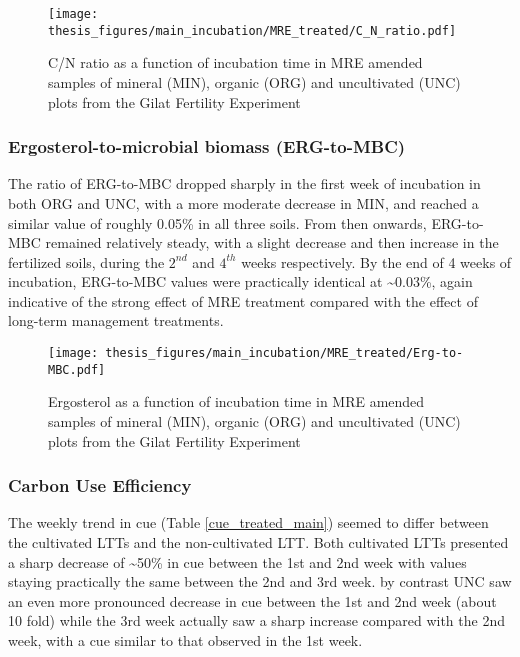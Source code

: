 \documentclass[12pt]{report}
\begin{document}
		\begin{figure}[H]
			\centering
			\texttt{[image: thesis\_figures/main\_incubation/MRE\_treated/C\_N\_ratio.pdf]}
			\caption{C/N ratio  as a function of incubation time in MRE amended samples of mineral (MIN), organic (ORG) and uncultivated (UNC) plots from the Gilat Fertility Experiment}
			\label{fig:c_n_ratio_treated_main}
		\end{figure}
		
		
		
		
		
		\subsubsection{Ergosterol-to-microbial biomass (ERG-to-MBC)}
		
		The ratio of ERG-to-MBC dropped sharply in the first week of incubation in both ORG and UNC, with a more moderate decrease in 	MIN, and reached a similar value of  roughly 0.05\% in all three soils. From then onwards, ERG-to-MBC remained relatively steady, with a slight decrease and then increase in the fertilized soils, during the $2^{nd}$ and $ 4^{th} $ weeks respectively. By the end of 4 weeks of incubation,  ERG-to-MBC values were practically identical at \~{}0.03\%, again indicative of the strong effect of MRE treatment compared with the effect of long-term management treatments.
		
		\begin{figure}[H]
			
			\centering
			\texttt{[image: thesis\_figures/main\_incubation/MRE\_treated/Erg-to-MBC.pdf]}
			\caption{Ergosterol as a function of incubation time in MRE amended samples of mineral (MIN), organic (ORG) and uncultivated (UNC) plots from the Gilat Fertility Experiment}
			\label{fig:erg_treated_main}
		\end{figure}
		
		\vspace{5cm}
		
		\subsubsection{Carbon Use Efficiency}
		The weekly trend in \gls{cue} (Table \ref{cue_treated_main}) seemed to differ between the cultivated LTTs and the non-cultivated LTT. Both cultivated LTTs presented a sharp decrease of \~{}50\% in \gls{cue} between the 1st and 2nd week with values staying practically the same between the 2nd and 3rd week. by contrast UNC saw an even more pronounced decrease in \gls{cue} between the 1st and 2nd week (about 10 fold) while the 3rd week actually saw a sharp increase compared with the 2nd week, with a \gls{cue} similar to that observed in the 1st week.
		
\end{document}
